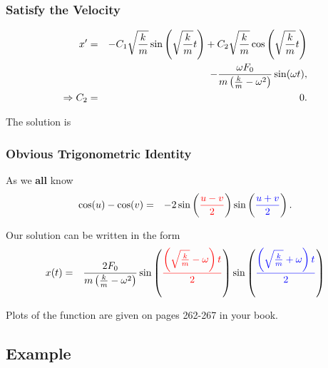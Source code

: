\begin{frame}
  \frametitle{Satisfy the Velocity}

  \begin{eqnarray*}
    x' & = & - C_1 \sqrt{\frac{k}{m}} \sin\left(\sqrt{\frac{k}{m}}t\right) + C_2 \sqrt{\frac{k}{m}} \cos\left(\sqrt{\frac{k}{m}}t\right) \\
    & & - \frac{\omega F_0}{m\left(\frac{k}{m}-\omega^2\right)} \sin(\omega t), \\
    \Rightarrow C_2 & = & 0.
  \end{eqnarray*}

  {
    The solution is
  }


\end{frame}


\begin{frame}
  \frametitle{Obvious Trigonometric Identity}

  As we \textbf{all} know
  \begin{eqnarray*}
    \cos(u) - \cos(v) & = & -2 \sin\left({\color{red}\frac{u-v}{2}}\right) \sin\left({\color{blue}\frac{u+v}{2}}\right).
  \end{eqnarray*}

  Our solution can be written in the form
  \begin{eqnarray*}
    x(t) & = & \frac{2F_0}{m\left(\frac{k}{m}-\omega^2\right)} \sin\left({\color{red}\frac{\left(\sqrt{\frac{k}{m}}-\omega\right) t}{2}}\right)
                                                        \sin\left({\color{blue}\frac{\left(\sqrt{\frac{k}{m}}+\omega\right) t}{2}}\right)
  \end{eqnarray*}

  Plots of the function are given on pages 262-267 in your book.

\end{frame}

\subsection{Example}

